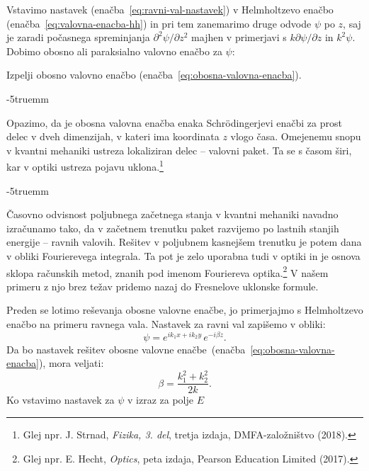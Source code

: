 Vstavimo
nastavek (enačba~\ref{eq:ravni-val-nastavek}) v Helmholtzevo enačbo (enačba~\ref{eq:valovna-enacba-hh})
in pri tem zanemarimo druge odvode $\psi$ po $z$, saj je zaradi počasnega spreminjanja
$\partial^{2}\psi/\partial z^{2}$ majhen v primerjavi s $k\partial\psi/\partial z$ in $k^{2}\psi$.
Dobimo obosno
ali paraksialno valovno enačbo za $\psi$:
\begin{naloga}
Izpelji obosno valovno enačbo (enačba~\ref{eq:obosna-valovna-enacba}).
\end{naloga}
\vglue-5truemm
\begin{remark} 
Opazimo, da je obosna valovna enačba enaka Schr\"{o}dingerjevi enačbi
za prost delec v dveh dimenzijah, v kateri ima koordinata $z$ vlogo
časa. Omejenemu snopu v kvantni mehaniki ustreza lokaliziran delec
-- valovni paket. Ta se s časom širi, kar v optiki ustreza pojavu 
uklona.\footnote{Glej npr. J. Strnad, {\it Fizika, 3. del}, tretja izdaja, DMFA-založništvo (2018).}
\end{remark}
\vglue-5truemm
\begin{remark}
Časovno odvisnost poljubnega začetnega
stanja v kvantni mehaniki navadno izračunamo tako, da v začetnem
trenutku paket razvijemo po lastnih stanjih energije -- ravnih valovih.
Rešitev v poljubnem kasnejšem trenutku je potem dana v obliki Fourierevega
integrala. Ta pot je zelo uporabna tudi v optiki in je osnova sklopa
računskih metod, znanih pod imenom Fouriereva optika.\footnote{Glej npr. 
E. Hecht, {\it Optics}, peta izdaja, Pearson Education Limited (2017).} V našem primeru
z njo brez težav pridemo nazaj do Fresnelove uklonske formule.
\end{remark}
Preden se lotimo reševanja obosne valovne enačbe, jo primerjajmo s Helmholtzevo enačbo
na primeru ravnega vala. Nastavek za ravni val  zapišemo v obliki:
\begin{equation}
\psi=e^{ik_{1}x+ik_{2}y}\, e^{-i\beta z}.
\label{eq:ravni-val-nastavek-obosni}
\end{equation}
Da bo nastavek rešitev
obosne valovne enačbe~(enačba~\ref{eq:obosna-valovna-enacba}), mora veljati:
\begin{equation}
\beta=\frac{k_{1}^{2}+k_{2}^{2}}{2k}.
\end{equation}
Ko vstavimo nastavek za $\psi$ v izraz za polje $E$ 
